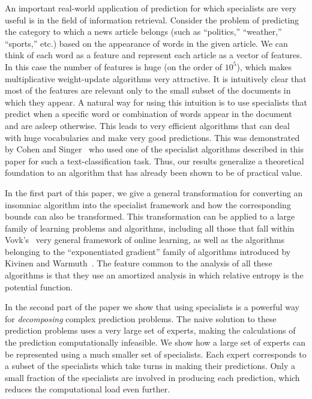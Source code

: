 An important real-world application of prediction for which
specialists are very useful is in the field of information
retrieval.
Consider the problem of predicting the category to which a news
article belongs (such as ``politics,'' ``weather,'' ``sports,'' etc.)
based on the appearance of words in the given article.
We can think of each word as a feature and
represent each article as a vector of features.
In this case the number of features is huge (on the order of $10^5$),
which makes multiplicative weight-update algorithms very
attractive.
It is intuitively clear that most of the features are relevant only to
the small subset of the documents in which they appear. A natural way
for using this intuition is to use specialists that
predict when a specific word or combination of words
appear in the document and are
asleep otherwise. This leads to very efficient algorithms that can
deal with huge vocabularies and make very good predictions.
This was demonstrated by Cohen and Singer~\cite{CohenSi96} who used one of the
specialist algorithms described in this paper for such a
text-classification task.
Thus, our results generalize a theoretical foundation to an algorithm that has
already been shown to be of practical value.

In the first part of this paper, we give a general transformation for
converting an insomniac algorithm into the specialist framework and
how the corresponding bounds can also be transformed.
This transformation can be applied to a large family of learning
problems and algorithms, including all those that fall within
Vovk's~\cite{Vovk95} very general framework of online learning, as well as
the algorithms belonging to the ``exponentiated gradient'' family of
algorithms introduced by Kivinen and Warmuth~\cite{KivinenWa95}.
The feature common to the analysis of all these algorithms is that they
use an amortized analysis in which relative entropy is the potential function.

In the second part of the paper we show that using specialists is a
powerful way for {\em decomposing\/} complex prediction problems. 
The naive solution to these prediction problems uses a very
large set of experts, making the 
calculations of the prediction computationally infeasible.
We show how a large set of experts can be represented using a much smaller
set of specialists. Each expert corresponds to a subset of the
specialists which take turns in making their predictions. 
Only a small fraction of the specialists are involved in producing each
prediction, which reduces the computational load even further.


